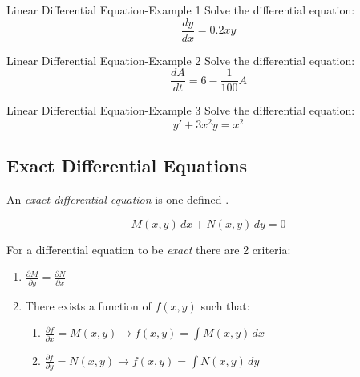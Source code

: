 \begin{example}[]{Linear Differential Equation-Example 1}
  Solve the differential equation:
  \begin{equation*}
    \frac{dy}{dx} = 0.2 xy
  \end{equation*}

  \tcblower

\end{example}

\begin{example}[]{Linear Differential Equation-Example 2}
  Solve the differential equation:
  \begin{equation*}
    \frac{dA}{dt} = 6 - \frac{1}{100} A
  \end{equation*}

  \tcblower

\end{example}

\begin{example}[]{Linear Differential Equation-Example 3}
  Solve the differential equation:
  \begin{equation*}
    y' + 3x^{2} y = x^{2}
  \end{equation*}

  \tcblower

\end{example}

\subsection{Exact Differential Equations} \label{subsec:Exact ODEs}
\begin{definition} \label{def:Exact ODE}
  An \emph{exact differential equation} is one defined .

  \begin{equation} \label{eq:Exact ODE}
    M(x,y) \, dx + N(x,y) \, dy = 0
  \end{equation}

  For a differential equation to be \emph{exact} there are 2 criteria:
  \begin{enumerate}
    \item $\frac{\partial M}{\partial y} = \frac{\partial N}{\partial x}$
    \item There exists a function of $f(x,y)$ such that:
      \begin{enumerate}
        \item $\frac{\partial f}{\partial x} = M(x,y) \rightarrow f(x,y) = \int M(x,y) \, dx$
        \item $\frac{\partial f}{\partial y} = N(x,y) \rightarrow f(x,y) = \int N(x,y) \, dy$
      \end{enumerate}
  \end{enumerate}
\end{definition}

